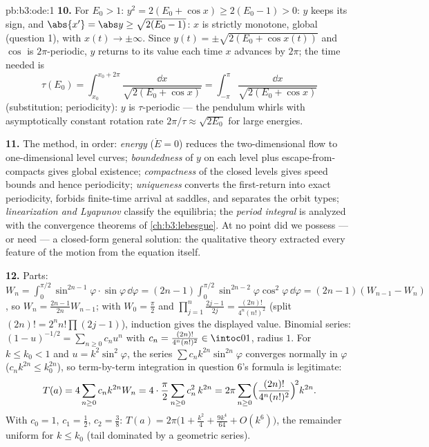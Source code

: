 \begin{solution}{pb:b3:ode:1}
\textbf{10.} For $E_0 > 1$: $y^2 = 2(E_0 + \cos x) \geq
2(E_0 - 1) > 0$: $y$ keeps its sign, and $\abs{x'} = \abs y
\geq \sqrt{2(E_0 - 1)}$: $x$ is strictly monotone, global
(question 1), with $x(t) \to \pm\infty$. Since $y(t) =
\pm\sqrt{2(E_0 + \cos x(t))}$ and $\cos$ is $2\pi$-periodic,
$y$ returns to its value each time $x$ advances by $2\pi$;
the time needed is
\[
\tau(E_0) = \int_{x_0}^{x_0 + 2\pi}\frac{\dd
x}{\sqrt{2(E_0 + \cos x)}} =
\int_{-\pi}^{\pi}\frac{\dd x}{\sqrt{2(E_0 + \cos x)}}
\]
(substitution; periodicity): $y$ is $\tau$-periodic ---
the pendulum whirls with asymptotically constant rotation
rate $2\pi/\tau \approx \sqrt{2E_0}$ for large energies.

\textbf{11.} The method, in order: \emph{energy} ($\dot E =
0$) reduces the two-dimensional flow to one-dimensional
level curves; \emph{boundedness} of $y$ on each level plus
escape-from-compacts gives global existence;
\emph{compactness} of the closed levels gives speed bounds
and hence periodicity; \emph{uniqueness} converts the
first-return into exact periodicity, forbids finite-time
arrival at saddles, and separates the orbit types;
\emph{linearization and Lyapunov} classify the equilibria;
the \emph{period integral} is analyzed with the convergence
theorems of \cref{ch:b3:lebesgue}. At no point did we
possess --- or need --- a closed-form general solution: the
qualitative theory extracted every feature of the motion
from the equation itself.

\textbf{12.} Parts: $W_n = \int_0^{\pi/2}\sin^{2n-1}\varphi
\cdot\sin\varphi\,\dd\varphi = (2n-1)\int_0^{\pi/2}
\sin^{2n-2}\varphi\cos^2\varphi\,\dd\varphi = (2n-1)(W_{n-1}
- W_n)$, so $W_n = \frac{2n-1}{2n}W_{n-1}$; with $W_0 =
\frac\pi2$ and $\prod_{j=1}^n\frac{2j-1}{2j} =
\frac{(2n)!}{4^n(n!)^2}$ (split $(2n)! = 2^nn!\prod(2j-1)$),
induction gives the displayed value. Binomial series: $(1 -
u)^{-1/2} = \sum_{n\geq0}c_nu^n$ with $c_n =
\frac{(2n)!}{4^n(n!)^2} \in \intoc01$, radius $1$. For $k
\leq k_0 < 1$ and $u = k^2\sin^2\varphi$, the series
$\sum c_nk^{2n}\sin^{2n}\varphi$ converges normally in
$\varphi$ ($c_nk^{2n} \leq k_0^{2n}$), so term-by-term
integration in question 6's formula is legitimate:
\[
T(a) = 4\sum_{n\geq0}c_nk^{2n}W_n
= 4\cdot\frac\pi2\sum_{n\geq0}c_n^2\,k^{2n}
= 2\pi\sum_{n\geq0}
\Bigl(\frac{(2n)!}{4^n(n!)^2}\Bigr)^{\!2}k^{2n} .
\]
With $c_0 = 1$, $c_1 = \frac12$, $c_2 = \frac38$: $T(a) =
2\pi\bigl(1 + \frac{k^2}4 + \frac{9k^4}{64} + O(k^6)\bigr)$,
the remainder uniform for $k \leq k_0$ (tail dominated by a
geometric series).


\end{solution}
